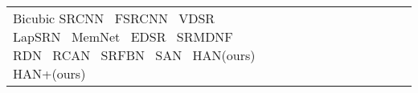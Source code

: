 \documentclass[runningheads]{llncs}
\begin{document}
\begin{table}[!ht]
\begin{tabular}{|p{7em}|p{2.5em}|p{2.5em}|p{3em}|p{2.5em}|p{3em}|p{2.5em}|p{3em}|p{2.5em}|p{3em}|p{2.5em}|p{3em}|}
		\hline
		\hline
		Bicubic \newline{}SRCNN~\cite{dong2014learning} \newline{} FSRCNN~\cite{dong2016accelerating} \newline{} VDSR~\cite{kim2016accurate} \newline{} LapSRN~\cite{lai2017deep} \newline{} MemNet~\cite{tai2017memnet} \newline{} EDSR~\cite{lim2017enhanced} \newline{} SRMDNF~\cite{zhang2018learning}  \newline{} RDN~\cite{zhang2018residual} \newline{} RCAN~\cite{zhang2018image} \newline{} SRFBN~\cite{li2019feedback} \newline{} SAN~\cite{dai2019second} \newline{} HAN(ours) \newline{} HAN+(ours)&

\end{tabular}
\end{table}
\end{document}
